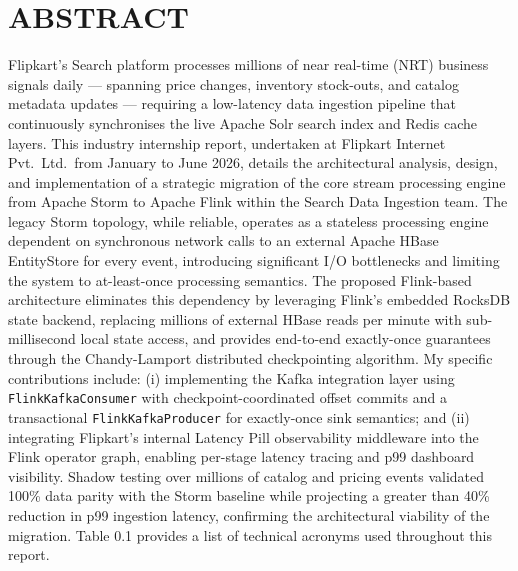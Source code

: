 \newpage
\section*{ABSTRACT}
\begin{justify}
    Flipkart's Search platform processes millions of near real-time (NRT) business signals daily — spanning price changes, inventory stock-outs, and catalog metadata updates — requiring a low-latency data ingestion pipeline that continuously synchronises the live Apache Solr search index and Redis cache layers. This industry internship report, undertaken at Flipkart Internet Pvt.\ Ltd.\ from January to June 2026, details the architectural analysis, design, and implementation of a strategic migration of the core stream processing engine from Apache Storm to Apache Flink within the Search Data Ingestion team. The legacy Storm topology, while reliable, operates as a stateless processing engine dependent on synchronous network calls to an external Apache HBase EntityStore for every event, introducing significant I/O bottlenecks and limiting the system to at-least-once processing semantics. The proposed Flink-based architecture eliminates this dependency by leveraging Flink's embedded RocksDB state backend, replacing millions of external HBase reads per minute with sub-millisecond local state access, and provides end-to-end exactly-once guarantees through the Chandy-Lamport distributed checkpointing algorithm. My specific contributions include: (i) implementing the Kafka integration layer using \texttt{FlinkKafkaConsumer} with checkpoint-coordinated offset commits and a transactional \texttt{FlinkKafkaProducer} for exactly-once sink semantics; and (ii) integrating Flipkart's internal Latency Pill observability middleware into the Flink operator graph, enabling per-stage latency tracing and p99 dashboard visibility. Shadow testing over millions of catalog and pricing events validated 100\% data parity with the Storm baseline while projecting a greater than 40\% reduction in p99 ingestion latency, confirming the architectural viability of the migration. Table 0.1 provides a list of technical acronyms used throughout this report.


\end{justify}
